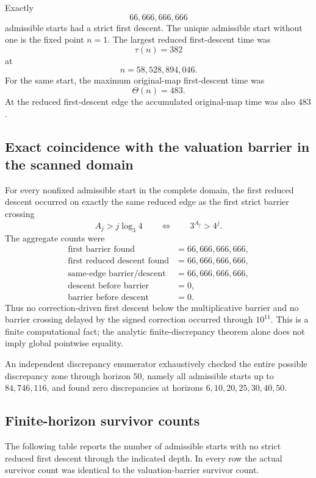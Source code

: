 \documentclass[11pt]{article}
\theoremstyle{definition}
\theoremstyle{remark}
\begin{document}
Exactly
\[
66{,}666{,}666{,}666
\]
admissible starts had a strict first descent.  The unique admissible start without one is the fixed point $n=1$.  The largest reduced first-descent time was
\[
\boxed{\tau(n)=382}
\]
at
\[
\boxed{n=58{,}528{,}894{,}046}.
\]
For the same start, the maximum original-map first-descent time was
\[
\boxed{\Theta(n)=483}.
\]
At the reduced first-descent edge the accumulated original-map time was also $483$.

\subsection{Exact coincidence with the valuation barrier in the scanned domain}

For every nonfixed admissible start in the complete domain, the first reduced descent occurred on exactly the same reduced edge as the first strict barrier crossing
\[
A_j>j\log_3 4
\qquad\Longleftrightarrow\qquad
3^{A_j}>4^j.
\]
The aggregate counts were
\begin{align*}
\text{first barrier found} &=66{,}666{,}666{,}666,\\
\text{first reduced descent found} &=66{,}666{,}666{,}666,\\
\text{same-edge barrier/descent} &=66{,}666{,}666{,}666,\\
\text{descent before barrier} &=0,\\
\text{barrier before descent} &=0.
\end{align*}
Thus no correction-driven first descent below the multiplicative barrier and no barrier crossing delayed by the signed correction occurred through $10^{11}$.  This is a finite computational fact; the analytic finite-discrepancy theorem alone does not imply global pointwise equality.

An independent discrepancy enumerator exhaustively checked the entire possible discrepancy zone through horizon $50$, namely all admissible starts up to $84{,}746{,}116$, and found zero discrepancies at horizons $6,10,20,25,30,40,50$.

\subsection{Finite-horizon survivor counts}

The following table reports the number of admissible starts with no strict reduced first descent through the indicated depth.  In every row the actual survivor count was identical to the valuation-barrier survivor count.
\end{document}
